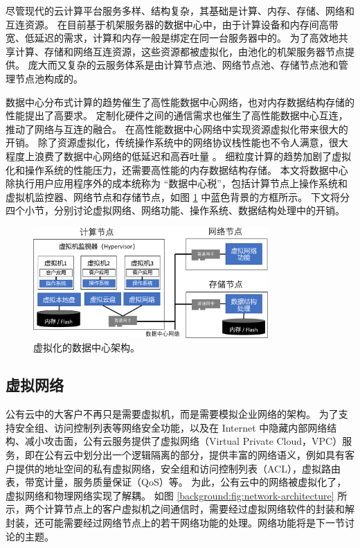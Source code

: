 尽管现代的云计算平台服务多样、结构复杂，其基础是计算、内存、存储、网络和互连资源。
在目前基于机架服务器的数据中心中，由于计算设备和内存间高带宽、低延迟的需求，计算和内存一般是绑定在同一台服务器中的。
为了高效地共享计算、存储和网络互连资源，这些资源都被虚拟化，由池化的机架服务器节点提供。
庞大而又复杂的云服务体系是由计算节点池、网络节点池、存储节点池和管理节点池构成的。
\fi

数据中心分布式计算的趋势催生了高性能数据中心网络，也对内存数据结构存储的性能提出了高要求。
定制化硬件之间的通信需求也催生了高性能数据中心互连，推动了网络与互连的融合。
在高性能数据中心网络中实现资源虚拟化带来很大的开销。
除了资源虚拟化，传统操作系统中的网络协议栈性能也不令人满意，很大程度上浪费了数据中心网络的低延迟和高吞吐量 \cite{barroso2017attack}。
细粒度计算的趋势加剧了虚拟化和操作系统的性能压力，还需要高性能的内存数据结构存储。
本文将数据中心除执行用户应用程序外的成本统称为 ``数据中心税''，包括计算节点上操作系统和虚拟机监控器、网络节点和存储节点，如图 \ref{background:fig:virt-architecture} 中蓝色背景的方框所示。
下文将分四个小节，分别讨论虚拟网络、网络功能、操作系统、数据结构处理中的开销。


\begin{figure}[htbp]
	\centering
	\includegraphics[width=0.8\textwidth]{figures/virt_arch.pdf}
	\caption{虚拟化的数据中心架构。}
	\label{background:fig:virt-architecture}
\end{figure}


\subsection{虚拟网络}


公有云中的大客户不再只是需要虚拟机，而是需要模拟企业网络的架构。
为了支持安全组、访问控制列表等网络安全功能，以及在 Internet 中隐藏内部网络结构、减小攻击面，公有云服务提供了虚拟网络（Virtual Private Cloud，VPC）服务，即在公有云中划分出一个逻辑隔离的部分，提供丰富的网络语义，例如具有客户提供的地址空间的私有虚拟网络，安全组和访问控制列表（ACL），虚拟路由表，带宽计量，服务质量保证（QoS）等。 
为此，公有云中的网络被虚拟化了，虚拟网络和物理网络实现了解耦。
如图 \ref{background:fig:network-architecture} 所示，两个计算节点上的客户虚拟机之间通信时，需要经过虚拟网络软件的封装和解封装，还可能需要经过网络节点上的若干网络功能的处理。网络功能将是下一节讨论的主题。

